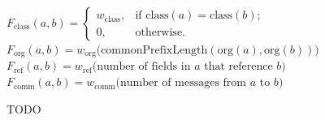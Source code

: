 
\begin{algorithm}
	$F_{\text{class}}(a, b) = \begin{cases}w_{\text{class}}, & \text{if $\text{class}(a) = \text{class}(b)$;} \\ 0, & \text{otherwise}.\end{cases}$ \;
	$F_{\text{org}}(a, b) = w_{\text{org}}\bigl(\text{commonPrefixLength}(\text{org}(a), \text{org}(b))\bigr)$ \;
	$F_{\text{ref}}(a, b) = w_{\text{ref}}\bigl(\text{number of fields in $a$ that reference $b$}\bigr)$ \;
	$F_{\text{comm}}(a, b) = w_{\text{comm}}\bigl(\text{number of messages from $a$ to $b$}\bigr)$ \;
\end{algorithm}

\begin{table}
	\centering
	\caption{TODO}
	\label{tab:visualization_approach/mapping/object_graph/default_configuration}
	\begin{threeparttable}
		\centering
		{\footnotesize
		}
	\end{threeparttable}
\end{table}

